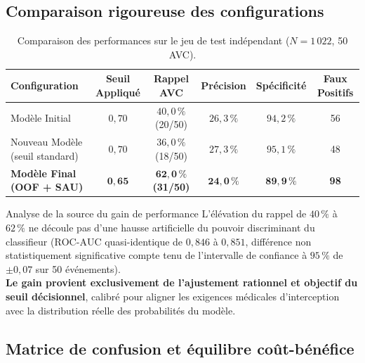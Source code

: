 \documentclass[11pt,a4paper]{article}
\begin{document}
\subsection{Comparaison rigoureuse des configurations}

\begin{table}[htbp]
\centering
\caption{Comparaison des performances sur le jeu de test indépendant ($N = 1\,022$, 50 AVC).}
\label{tab:perf}
\vspace{0.2cm}
\begin{tabularx}{\textwidth}{lccccc}
\toprule
\textbf{Configuration} & \textbf{Seuil Appliqué} & \textbf{Rappel AVC} & \textbf{Précision} & \textbf{Spécificité} & \textbf{Faux Positifs} \\
\midrule
Modèle Initial & $0{,}70$ & $40{,}0\,\%$ (20/50) & $26{,}3\,\%$ & $94{,}2\,\%$ & 56 \\
Nouveau Modèle (seuil standard) & $0{,}70$ & $36{,}0\,\%$ (18/50) & $27{,}3\,\%$ & $95{,}1\,\%$ & 48 \\
\textbf{Modèle Final (OOF + SAU)} & $\mathbf{0{,}65}$ & $\mathbf{62{,}0\,\%}$ \textbf{(31/50)} & $\mathbf{24{,}0\,\%}$ & $\mathbf{89{,}9\,\%}$ & \textbf{98} \\
\bottomrule
\end{tabularx}
\end{table}

\begin{medbox}{Analyse de la source du gain de performance}
L'élévation du rappel de $40\,\%$ à $62\,\%$ ne découle pas d'une hausse artificielle du pouvoir discriminant du classifieur ($\text{ROC-AUC}$ quasi-identique de $0{,}846$ à $0{,}851$, différence non statistiquement significative compte tenu de l'intervalle de confiance à $95\,\%$ de $\pm 0{,}07$ sur 50 événements). \\
\textbf{Le gain provient exclusivement de l'ajustement rationnel et objectif du seuil décisionnel}, calibré pour aligner les exigences médicales d'interception avec la distribution réelle des probabilités du modèle.
\end{medbox}

\subsection{Matrice de confusion et équilibre coût-bénéfice}
\end{document}
